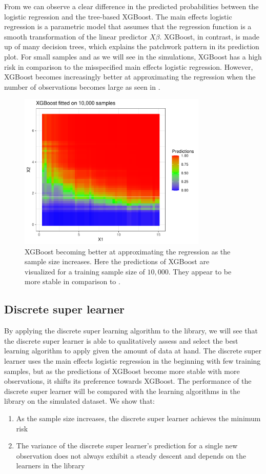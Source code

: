 \documentclass[./main.tex]{subfiles}
\begin{document}
From  we can observe a clear difference in the predicted probabilities between the logistic regression and the tree-based XGBoost. The main effects logistic regression is a parametric model that assumes that the regression function is a smooth transformation of the linear predictor $ X\beta $. XGBoost, in contrast, is made up of many decision trees, which explains the patchwork pattern in its prediction plot. For small samples and as we will see in the simulations, XGBoost has a high risk in comparison to the misspecified main effects logistic regression. However, XGBoost becomes increasingly better at approximating the regression when the number of observations becomes large as seen in . 
\begin{figure}[H]
    \centering
    \includegraphics[width=0.8\textwidth]{figures/xgboost10k.pdf}
    \caption{XGBoost becoming better at approximating the regression as the sample size increases. Here the predictions of XGBoost are visualized for a training sample size of $ 10,000 $. They appear to be more stable in comparison to .}
    \label{fig:xgboost10k}
\end{figure}
\subsection{Discrete super learner} \label{sim_dsl}
By applying the discrete super learning algorithm to the library, we will see that the discrete super learner is able to qualitatively assess and select the best learning algorithm to apply given the amount of data at hand. The discrete super learner uses the main effects logistic regression in the beginning with few training samples, but as the predictions of XGBoost become more stable with more observations, it shifts its preference towards XGBoost. The performance of the discrete super learner will be compared with the learning algorithms in the library on the simulated dataset. We show that:
\begin{enumerate}
    \item As the sample size increases, the discrete super learner achieves the minimum risk 
    \item The variance of the discrete super learner's prediction for a single new observation does not always exhibit a steady descent and depends on the learners in the library
\end{enumerate}
\end{document}

